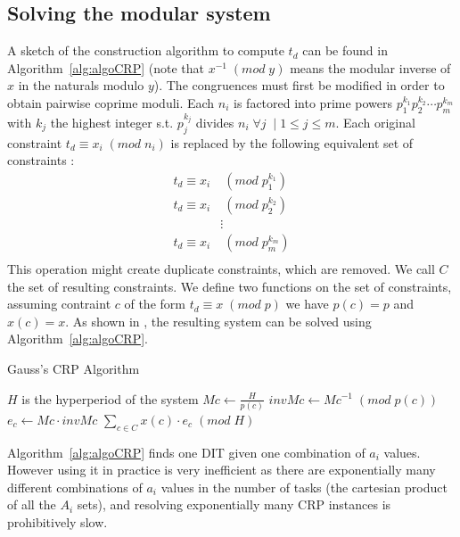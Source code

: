 \documentclass[conference]{IEEEtran}
\begin{document}
	\subsection{Solving the modular system}
		A sketch of the construction algorithm to compute $t_d$ can be found in
		Algorithm~\ref{alg:algoCRP} (note that $x^{-1} \; (mod \; y)$ means the
		modular inverse of $x$ in the naturals modulo $y$). The congruences must
		first be modified in order to obtain pairwise coprime moduli. Each $n_i$
		is factored into prime powers $p^{k_1}_1 p^{k_2}_2 \cdots p^{k_m}_m$
		with $k_j$ the highest integer s.t. $p^{k_j}_j$ divides $n_i \; \forall j
		\; \mid 1 \leqslant j \leqslant m$. Each original constraint $t_d \equiv x_i
		\; (mod \; n_i)$ is replaced by the following equivalent set of constraints \cite{knuth1969art}:
		\begin{equation*}
			\begin{split}
				t_d \equiv x_i 	& \; (mod \; p^{k_1}_1) \\
				t_d \equiv x_i 	& \; (mod \; p^{k_2}_2) \\
								& \vdots \\
				t_d \equiv x_i 	& \; (mod \; p^{k_m}_m) \\
			\end{split}
		\end{equation*}
		This operation might create
		duplicate constraints, which are removed. We call $C$ the set of
		resulting constraints. We define two functions on the set of
		constraints, assuming contraint $c$ of the form $t_d \equiv x \; (mod \; p)$
		we have $p(c) = p$ and $x(c) = x$. As shown in \cite{knuth1969art}, the resulting system can be solved
        using Algorithm~\ref{alg:algoCRP}.

		\begin{algorithm}
			\caption{Gauss's CRP Algorithm}
			\label{alg:algoCRP}
			\begin{algorithmic}[1]
				\REQUIRE $H$ is the hyperperiod of the system
					\STATE $Mc \leftarrow \frac{H}{p(c)}$
					\STATE $invMc \leftarrow Mc^{-1} \; (mod \; p(c))$
					\STATE $e_c \leftarrow Mc \cdot invMc$
				\ENDFOR
				\RETURN $\sum\limits_{c \in C}{x(c) \cdot e_c} \; (mod \; H)$
			\end{algorithmic}
		\end{algorithm}

		Algorithm~\ref{alg:algoCRP} finds one DIT given one combination of $a_i$
		values. However using it in practice is very inefficient as there are
		exponentially many different combinations of $a_i$ values in the number of
		tasks (the cartesian product of all the $A_i$ sets), and resolving
		exponentially many CRP instances is prohibitively slow.
\end{document}
